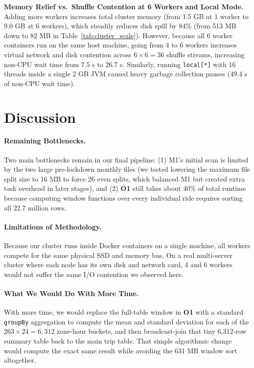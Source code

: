 \documentclass[sigconf,nonacm]{acmart}
\begin{document}
\textbf{Memory Relief vs.\ Shuffle Contention at 6 Workers and Local Mode.} Adding more workers increases total cluster memory (from 1.5 GB at 1 worker to 9.0 GB at 6 workers), which steadily reduces disk spill by 84\% (from 513 MB down to 82 MB in Table~\ref{tab:cluster_scale}). However, because all 6 worker containers run on the same host machine, going from 4 to 6 workers increases virtual network and disk contention across $6 \times 6 = 36$ shuffle streams, increasing non-CPU wait time from 7.5 s to 26.7 s. Similarly, running \texttt{local[*]} with 16 threads inside a single 2 GB JVM caused heavy garbage collection pauses (49.4 s of non-CPU wait time).

\section{Discussion}

\paragraph{Remaining Bottlenecks.}
Two main bottlenecks remain in our final pipeline: (1) M1's initial scan is limited by the two large pre-lockdown monthly files (we tested lowering the maximum file split size to 16 MB to force 26 even splits, which balanced M1 but created extra task overhead in later stages), and (2) \textbf{O1} still takes about 40\% of total runtime because computing window functions over every individual ride requires sorting all 22.7 million rows.

\paragraph{Limitations of Methodology.}
Because our cluster runs inside Docker containers on a single machine, all workers compete for the same physical SSD and memory bus. On a real multi-server cluster where each node has its own disk and network card, 4 and 6 workers would not suffer the same I/O contention we observed here.

\paragraph{What We Would Do With More Time.}
With more time, we would replace the full-table window in \textbf{O1} with a standard \texttt{groupBy} aggregation to compute the mean and standard deviation for each of the $263 \times 24 = 6{,}312$ zone-hour buckets, and then broadcast-join that tiny 6,312-row summary table back to the main trip table. That simple algorithmic change would compute the exact same result while avoiding the 631 MB window sort altogether.
\end{document}
